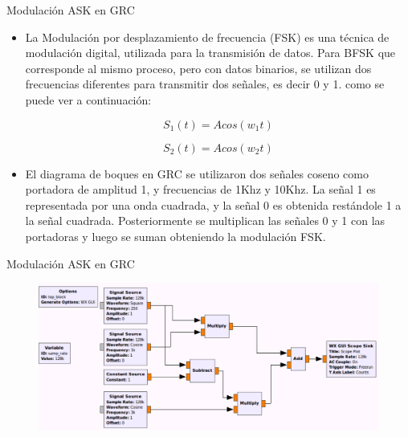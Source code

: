 \begin{frame}{Modulación ASK en GRC}

  \begin{itemize}
  \item {
La Modulación por desplazamiento de frecuencia (FSK) es una técnica de modulación digital, utilizada para la transmisión de datos. Para BFSK que corresponde al mismo proceso, pero con datos binarios, se utilizan dos frecuencias diferentes para transmitir dos señales, es decir 0 y 1. como se puede ver a continuación:

\begin{equation*}
S_{1}(t) = Acos(w_{1}t)
\end{equation*}

\begin{equation*}
S_{2}(t) = Acos(w_{2}t)
\end{equation*}

  }
  \item {
El diagrama de boques en GRC se utilizaron dos señales coseno como portadora de amplitud 1, y frecuencias de 1Khz y 10Khz. La señal 1 es representada por una onda cuadrada, y la señal 0 es obtenida restándole 1 a la señal cuadrada. Posteriormente se multiplican las señales 0 y 1 con las portadoras y luego se suman obteniendo la modulación FSK.
  }
  \end{itemize}
\end{frame}


\begin{frame}{Modulación ASK en GRC}
\vspace{-8mm}
\begin{figure}[H]
\centering
\includegraphics[width=\textwidth]{parte1/lab4/pdf/lab4_4.pdf}
\end{figure}
\end{frame}

